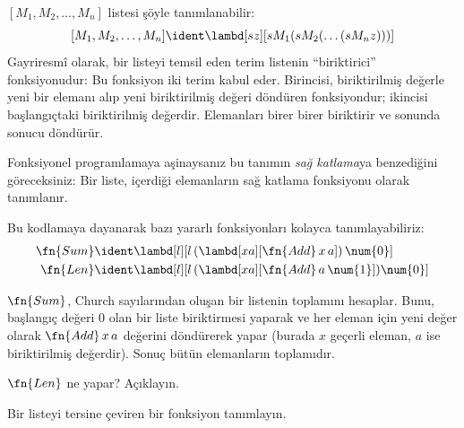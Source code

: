 


$[M_1, M_2, \ldots, M_n]$ listesi şöyle tanımlanabilir:
\[
  [M_1, M_2, \ldots, M_n] \ident \lambd[sz][s M_1 (s M_2 (\ldots (s M_n z)))]
\]
Gayriresmî olarak, bir listeyi temsil eden terim listenin ``biriktirici''
fonksiyonudur: Bu fonksiyon iki terim kabul eder. Birincisi, biriktirilmiş
değerle yeni bir elemanı alıp yeni biriktirilmiş değeri döndüren fonksiyondur;
ikincisi başlangıçtaki biriktirilmiş değerdir. Elemanları birer birer
biriktirir ve sonunda sonucu döndürür.

\begin{digress}
  Fonksiyonel programlamaya aşinaysanız bu tanımın \emph{sağ katlama}ya
  benzediğini göreceksiniz: Bir liste, içerdiği elemanların sağ katlama
  fonksiyonu olarak tanımlanır.
\end{digress}

Bu kodlamaya dayanarak bazı yararlı fonksiyonları kolayca tanımlayabiliriz:
\begin{align*}
  \fn{Sum} & \ident
  \lambd[l][l \, (\lambd[xa][\fn{Add} \, x \, a])\,  \num{0}]\\
  \fn{Len} & \ident
  \lambd[l][l \, (\lambd[xa][\fn{Add} \, a \, \num{1}]) \num{0}]
\end{align*}

$\fn{Sum}$, Church sayılarından oluşan bir listenin toplamını hesaplar.
Bunu, başlangıç değeri $\num{0}$ olan bir liste biriktirmesi yaparak ve her
eleman için yeni değer olarak $\fn{Add} \, x\, a$ değerini döndürerek yapar
(burada $x$ geçerli eleman, $a$ ise biriktirilmiş değerdir). Sonuç bütün
elemanların toplamıdır.

\begin{prob}
  $\fn{Len}$ ne yapar? Açıklayın.
\end{prob}

\begin{prob}
  Bir listeyi tersine çeviren bir fonksiyon tanımlayın.
\end{prob}
